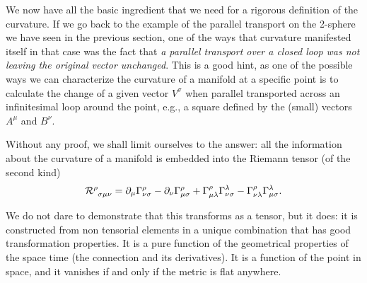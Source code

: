 We now have all the basic ingredient that we need for a rigorous definition of the
curvature. If we go back to the example of the parallel transport on the 2-sphere
we have seen in the previous section, one of the ways that curvature manifested
itself in that case was the fact that \emph{a parallel transport over a closed loop
was not leaving the original vector unchanged}. This is a good hint, as one of the
possible ways we can characterize the curvature of a manifold at a specific point
is to calculate the change of a given vector $V^\sigma$ when parallel transported
across an infinitesimal loop around the point, e.g., a square defined by the (small)
vectors $A^\mu$ and $B^\nu$.

Without any proof, we shall limit ourselves to the answer: all the information about
the curvature of a manifold is embedded into the Riemann tensor (of the second
kind)
\begin{align}\label{eq:riemann_tensor}
  \riemann{\rho}{\sigma\mu\nu} =
  \derx{\mu}\christoffel{\rho}{\nu\sigma} - \derx{\nu}\christoffel{\rho}{\mu\sigma} +
  \christoffel{\rho}{\mu\lambda}\christoffel{\lambda}{\nu\sigma} -
  \christoffel{\rho}{\nu\lambda}\christoffel{\lambda}{\mu\sigma}.
\end{align}

We do not dare to demonstrate that this transforms as a tensor, but it does: it is
constructed from non tensorial elements in a unique combination that has good
transformation properties. It is a pure function of the geometrical properties
of the space time (the connection and its derivatives). It is a function of the
point in space, and it vanishes if and only if the metric is flat anywhere.

